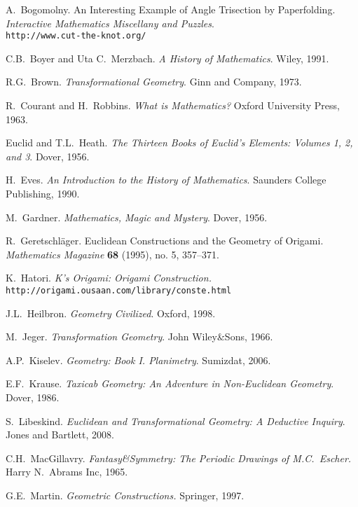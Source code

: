 \begin{thebibliography}{99}


 A.\ Bogomolny. An Interesting Example of Angle Trisection by Paperfolding. \emph{Interactive Mathematics Miscellany and Puzzles}.
\\ \texttt{http://www.cut-the-knot.org/}

 C.B.\ Boyer and Uta C.\ Merzbach. \emph{A History of Mathematics}. Wiley, 1991.

 R.G.\ Brown. \emph{Transformational Geometry}. Ginn and Company, 1973.

 R.\ Courant and H.\ Robbins. \emph{What is
  Mathematics?} Oxford University Press, 1963.

 Euclid and T.L.\ Heath. \emph{The Thirteen Books of Euclid's Elements: Volumes 1, 2, and 3}. Dover, 1956. 

 H.\ Eves. \emph{An Introduction to the History of Mathematics}. Saunders College Publishing, 1990.

 M.\ Gardner. \emph{Mathematics, Magic and Mystery}. Dover, 1956.

 R.\ Geretschl\"ager. Euclidean Constructions
  and the Geometry of Origami. \textit{Mathematics Magazine}
  \textbf{68} (1995), no. 5, 357--371.

 K.\ Hatori. \emph{K's Origami: Origami Construction.}
\\ \texttt{http://origami.ousaan.com/library/conste.html}

 J.L.\ Heilbron. \emph{Geometry Civilized}. Oxford, 1998.

 M.\ Jeger. \emph{Transformation Geometry}. John Wiley\&Sons, 1966.

 A.P.\ Kiselev. \emph{Geometry: Book
  I. Planimetry}. Sumizdat, 2006.

 E.F.\ Krause. \emph{Taxicab Geometry: An Adventure in Non-Euclidean Geometry}. Dover, 1986.

 S.\ Libeskind. \emph{Euclidean and
  Transformational Geometry: A Deductive Inquiry}. Jones and Bartlett,
  2008.

 C.H.\ MacGillavry. \emph{Fantasy\&Symmetry: The Periodic Drawings of M.C.\ Escher.} Harry N.\ Abrams Inc, 1965.

 G.E.\ Martin. \textit{Geometric Constructions.}
  Springer, 1997.


\end{thebibliography}
